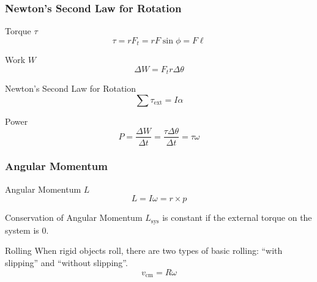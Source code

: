 \documentclass[table,letterpaper]{beamer}
\begin{document}
\begin{frame}
\frametitle{Newton's Second Law for Rotation}
\begin{block}{Torque $\tau$}
$$\tau = rF_t = rF\sin \phi = F\ell$$
\end{block}

\begin{block}{Work $W$}
$$\Delta W = F_tr\Delta \theta$$
\end{block}

\begin{block}{Newton's Second Law for Rotation}
$$\sum \tau_\text{ext} = I\alpha$$
\end{block}

\begin{block}{Power}
$$P = \frac{\Delta W}{\Delta t} = \frac{\tau\Delta\theta}{\Delta t} = \tau\omega$$
\end{block}
\end{frame}

\begin{frame}
\frametitle{Angular Momentum}
\begin{block}{Angular Momentum $L$}
$$L = I\omega = r \times p$$
\end{block}

\begin{block}{Conservation of Angular Momentum}
$L_\text{sys}$ is constant if the external torque on the system is 0.
\end{block}

\begin{block}{Rolling}
When rigid objects roll, there are two types of basic rolling: ``with slipping'' and ``without slipping''. $$v_\text{cm} = R\omega$$
\end{block}
\end{frame}
\end{document}
